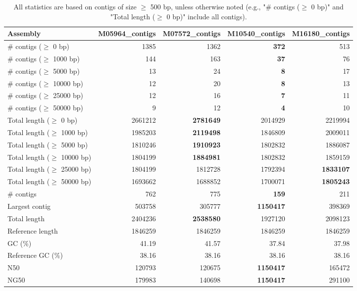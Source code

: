\documentclass[12pt,a4paper]{article}
\begin{document}
\begin{table}[ht]
\begin{center}
\caption{All statistics are based on contigs of size $\geq$ 500 bp, unless otherwise noted (e.g., "\# contigs ($\geq$ 0 bp)" and "Total length ($\geq$ 0 bp)" include all contigs).}
\begin{tabular}{|l*{4}{|r}|}
\hline
Assembly & M05964\_contigs & M07572\_contigs & M10540\_contigs & M16180\_contigs \\ \hline
\# contigs ($\geq$ 0 bp) & 1385 & 1362 & {\bf 372} & 513 \\ \hline
\# contigs ($\geq$ 1000 bp) & 144 & 163 & {\bf 37} & 76 \\ \hline
\# contigs ($\geq$ 5000 bp) & 13 & 24 & {\bf 8} & 17 \\ \hline
\# contigs ($\geq$ 10000 bp) & 12 & 20 & {\bf 8} & 13 \\ \hline
\# contigs ($\geq$ 25000 bp) & 12 & 16 & {\bf 7} & 11 \\ \hline
\# contigs ($\geq$ 50000 bp) & 9 & 12 & {\bf 4} & 10 \\ \hline
Total length ($\geq$ 0 bp) & 2661212 & {\bf 2781649} & 2014929 & 2219994 \\ \hline
Total length ($\geq$ 1000 bp) & 1985203 & {\bf 2119498} & 1846809 & 2009011 \\ \hline
Total length ($\geq$ 5000 bp) & 1810246 & {\bf 1910923} & 1802832 & 1886087 \\ \hline
Total length ($\geq$ 10000 bp) & 1804199 & {\bf 1884981} & 1802832 & 1859159 \\ \hline
Total length ($\geq$ 25000 bp) & 1804199 & 1812728 & 1792394 & {\bf 1833107} \\ \hline
Total length ($\geq$ 50000 bp) & 1693662 & 1688852 & 1700071 & {\bf 1805243} \\ \hline
\# contigs & 762 & 775 & {\bf 159} & 211 \\ \hline
Largest contig & 503758 & 305777 & {\bf 1150417} & 398369 \\ \hline
Total length & 2404236 & {\bf 2538580} & 1927120 & 2098123 \\ \hline
Reference length & 1846259 & 1846259 & 1846259 & 1846259 \\ \hline
GC (\%) & 41.19 & 41.57 & 37.84 & 37.98 \\ \hline
Reference GC (\%) & 38.16 & 38.16 & 38.16 & 38.16 \\ \hline
N50 & 120793 & 120675 & {\bf 1150417} & 165472 \\ \hline
NG50 & 179983 & 140698 & {\bf 1150417} & 291100 \\ \hline

\end{tabular}
\end{center}
\end{table}
\end{document}
